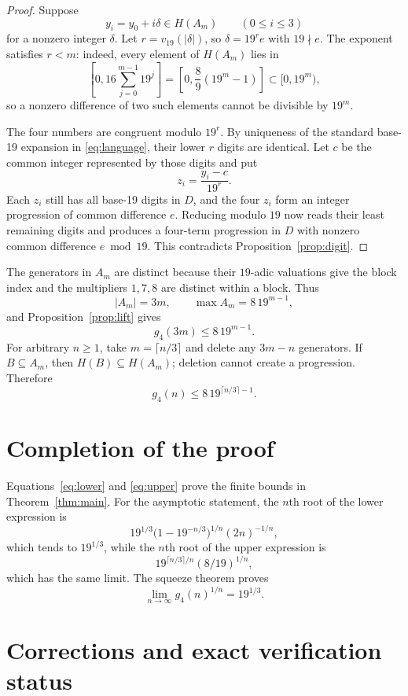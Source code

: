 \documentclass[11pt]{article}
\theoremstyle{remark}
\begin{document}
\begin{proof}
Suppose
\[
  y_i=y_0+i\delta\in H(A_m)\qquad(0\le i\le3)
\]
for a nonzero integer $\delta$.  Let $r=v_{19}(|\delta|)$, so
$\delta=19^r e$ with $19\nmid e$.  The exponent satisfies $r<m$: indeed,
every element of $H(A_m)$ lies in
\[
  \left[0,16\sum_{j=0}^{m-1}19^j\right]
  =\left[0,\frac89(19^m-1)\right]\subset[0,19^m),
\]
so a nonzero difference of two such elements cannot be divisible by $19^m$.

The four numbers are congruent modulo $19^r$.  By uniqueness of the standard
base-19 expansion in \eqref{eq:language}, their lower $r$ digits are identical.
Let $c$ be the common integer represented by those digits and put
\[
  z_i=\frac{y_i-c}{19^r}.
\]
Each $z_i$ still has all base-19 digits in $D$, and the four $z_i$ form an
integer progression of common difference $e$.  Reducing modulo $19$ now reads
their least remaining digits and produces a four-term progression in $D$ with
nonzero common difference $e\bmod19$.  This contradicts
Proposition~\ref{prop:digit}.
\end{proof}

The generators in $A_m$ are distinct because their $19$-adic valuations give
the block index and the multipliers $1,7,8$ are distinct within a block.  Thus
\[
  |A_m|=3m,
  \qquad \max A_m=8\,19^{m-1},
\]
and Proposition~\ref{prop:lift} gives
\[
  g_4(3m)\le8\,19^{m-1}.
\]
For arbitrary $n\ge1$, take $m=\lceil n/3\rceil$ and delete any $3m-n$
generators.  If $B\subseteq A_m$, then $H(B)\subseteq H(A_m)$; deletion cannot
create a progression.  Therefore
\begin{equation}\label{eq:upper}
  g_4(n)\le8\,19^{\lceil n/3\rceil-1}.
\end{equation}

\section{Completion of the proof}

Equations~\eqref{eq:lower} and \eqref{eq:upper} prove the finite bounds in
Theorem~\ref{thm:main}.  For the asymptotic statement, the $n$th root of the
lower expression is
\[
  19^{1/3}\bigl(1-19^{-n/3}\bigr)^{1/n}(2n)^{-1/n},
\]
which tends to $19^{1/3}$, while the $n$th root of the upper expression is
\[
  19^{\lceil n/3\rceil/n}(8/19)^{1/n},
\]
which has the same limit.  The squeeze theorem proves
\[
  \lim_{n\to\infty}g_4(n)^{1/n}=19^{1/3}.
\]

\section{Corrections and exact verification status}
\end{document}
